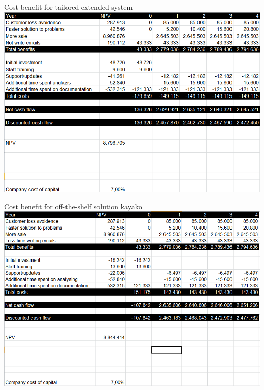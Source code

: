 \begin{thebibliography}{9}
	Cost benefit for tailored extended system\\
	\includegraphics[scale=0.6]{img/CostBenefit_TailoredExtended}

	Cost benefit for off-the-shelf solution kayako\\
	\includegraphics[scale=0.6]{img/CostBenefit_Off-the-shelf}

\end{thebibliography}
